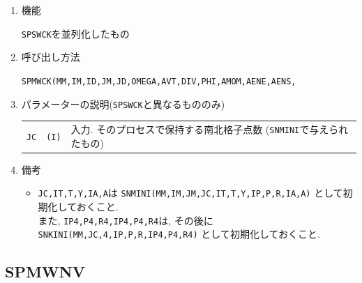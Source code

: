 \begin{enumerate}

\item 機能

{\tt SPSWCK}を並列化したもの

\item 呼び出し方法 

{\tt SPMWCK(MM,IM,ID,JM,JD,OMEGA,AVT,DIV,PHI,AMOM,AENE,AENS,}\\
\hspace*{10em}{\tt RN,IT,T,Y,IP4,P4,R4,IA,A,Q,WS,WW)}
  
\item パラメーターの説明({\tt SPSWCK}と異なるもののみ)

\begin{tabular}{lll}
{\tt JC} & {\tt (I)} & 入力. そのプロセスで保持する南北格子点数
                        ({\tt SNMINI}で与えられたもの)\\
\end{tabular}

\item 備考

\begin{itemize}

\item {\tt JC,IT,T,Y,IA,A}は 
      {\tt SNMINI(MM,IM,JM,JC,IT,T,Y,IP,P,R,IA,A)} として初期化しておくこと.\\
       また, {\tt IP4,P4,R4,IP4,P4,R4}は, その後に\\
      {\tt SNKINI(MM,JC,4,IP,P,R,IP4,P4,R4)} として初期化しておくこと.
      
 \end{itemize}

\end{enumerate}


\subsection{SPMWNV}

